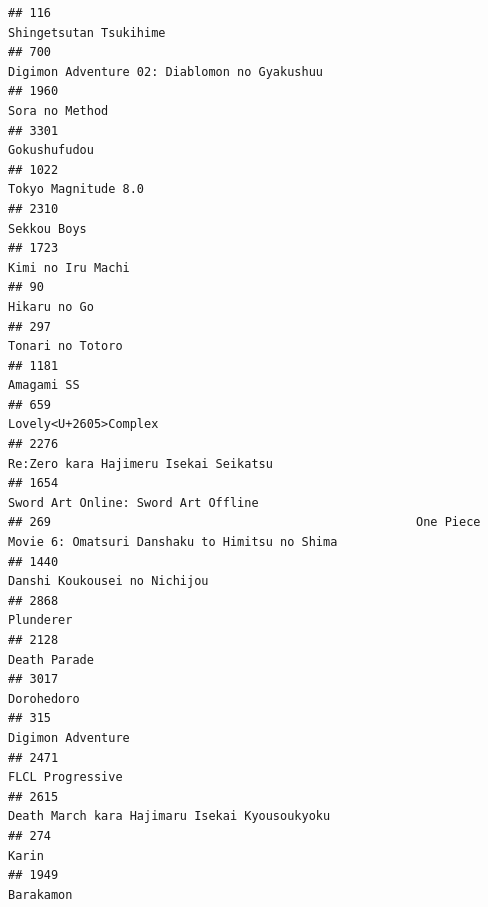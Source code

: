 \documentclass[
]{article}
\begin{document}
\begin{verbatim}
## 116                                                                                     Shingetsutan Tsukihime
## 700                                                               Digimon Adventure 02: Diablomon no Gyakushuu
## 1960                                                                                            Sora no Method
## 3301                                                                                              Gokushufudou
## 1022                                                                                       Tokyo Magnitude 8.0
## 2310                                                                                               Sekkou Boys
## 1723                                                                                         Kimi no Iru Machi
## 90                                                                                                Hikaru no Go
## 297                                                                                           Tonari no Totoro
## 1181                                                                                                Amagami SS
## 659                                                                                      Lovely<U+2605>Complex
## 2276                                                                     Re:Zero kara Hajimeru Isekai Seikatsu
## 1654                                                                       Sword Art Online: Sword Art Offline
## 269                                                   One Piece Movie 6: Omatsuri Danshaku to Himitsu no Shima
## 1440                                                                              Danshi Koukousei no Nichijou
## 2868                                                                                                 Plunderer
## 2128                                                                                              Death Parade
## 3017                                                                                                Dorohedoro
## 315                                                                                          Digimon Adventure
## 2471                                                                                          FLCL Progressive
## 2615                                                             Death March kara Hajimaru Isekai Kyousoukyoku
## 274                                                                                                      Karin
## 1949                                                                                                 Barakamon

\end{verbatim}
\end{document}
